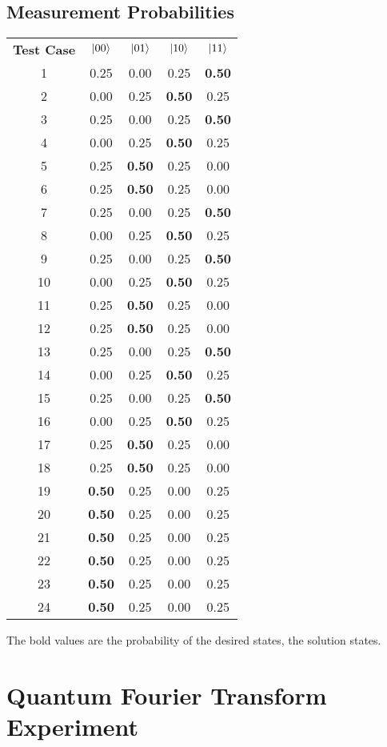 \clearpage
\subsection{Measurement Probabilities}
\label{sec:maxpermmeasprobs}
\centering
 \begin{tabular}{c|c|c|c|c|}
\textbf{Test Case} & $\left\vert{00}\right\rangle$& $\left\vert{01}\right\rangle$& $\left\vert{10}\right\rangle$& $\left\vert{11}\right\rangle$ \\
1 & 0.25 & 0.00 & 0.25 & \textbf{0.50} \\
2 & 0.00 & 0.25 & \textbf{0.50} & 0.25 \\
3 & 0.25 & 0.00 & 0.25 & \textbf{0.50} \\
4 & 0.00 & 0.25 & \textbf{0.50} & 0.25 \\
5 & 0.25 & \textbf{0.50} & 0.25 & 0.00 \\
6 & 0.25 & \textbf{0.50} & 0.25 & 0.00 \\
7 & 0.25 & 0.00 & 0.25 & \textbf{0.50} \\
8 & 0.00 & 0.25 & \textbf{0.50} & 0.25 \\
9 & 0.25 & 0.00 & 0.25 & \textbf{0.50} \\
10 & 0.00 & 0.25 & \textbf{0.50} & 0.25 \\
11 & 0.25 & \textbf{0.50} & 0.25 & 0.00 \\
12 & 0.25 & \textbf{0.50} & 0.25 & 0.00 \\
13 & 0.25 & 0.00 & 0.25 & \textbf{0.50} \\
14 & 0.00 & 0.25 & \textbf{0.50} & 0.25 \\
15 & 0.25 & 0.00 & 0.25 & \textbf{0.50} \\
16 & 0.00 & 0.25 & \textbf{0.50} & 0.25 \\
17 & 0.25 & \textbf{0.50} & 0.25 & 0.00 \\
18 & 0.25 & \textbf{0.50} & 0.25 & 0.00 \\
19 & \textbf{0.50} & 0.25 & 0.00 & 0.25 \\
20 & \textbf{0.50} & 0.25 & 0.00 & 0.25 \\
21 & \textbf{0.50} & 0.25 & 0.00 & 0.25 \\
22 & \textbf{0.50} & 0.25 & 0.00 & 0.25 \\
23 & \textbf{0.50} & 0.25 & 0.00 & 0.25 \\
24 & \textbf{0.50} & 0.25 & 0.00 & 0.25
 \end{tabular}

The bold values are the probability of the desired states, the solution states.

\clearpage
\section{Quantum Fourier Transform Experiment}
\label{sec:quantfourtransexp}


